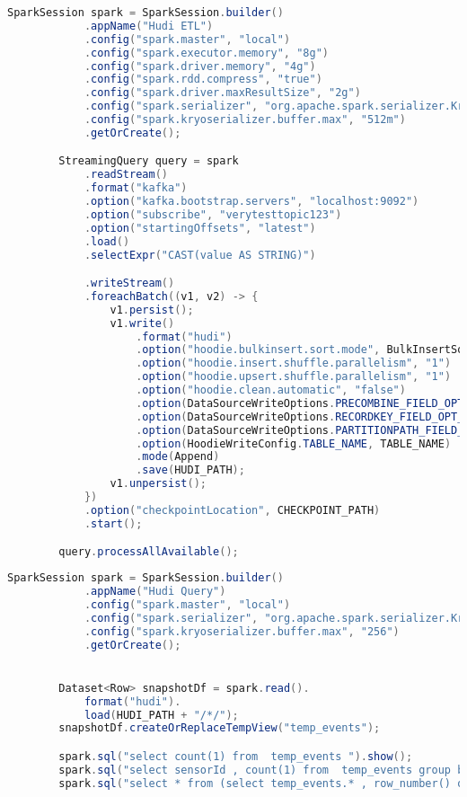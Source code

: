 \documentclass[%
bachelor,    %
subf,        %
href,        %
colorlinks,  %
]{disser}
\begin{document}
\begin{lstlisting}[caption={Запись из Kafka в Hudi таблицу},captionpos=b,label={lst:2},language=Java]
        SparkSession spark = SparkSession.builder()
            .appName("Hudi ETL")
            .config("spark.master", "local")
            .config("spark.executor.memory", "8g")
            .config("spark.driver.memory", "4g")
            .config("spark.rdd.compress", "true")
            .config("spark.driver.maxResultSize", "2g")
            .config("spark.serializer", "org.apache.spark.serializer.KryoSerializer")
            .config("spark.kryoserializer.buffer.max", "512m")
            .getOrCreate();

        StreamingQuery query = spark
            .readStream()
            .format("kafka")
            .option("kafka.bootstrap.servers", "localhost:9092")
            .option("subscribe", "verytesttopic123")
            .option("startingOffsets", "latest")
            .load()
            .selectExpr("CAST(value AS STRING)")

            .writeStream()
            .foreachBatch((v1, v2) -> {
                v1.persist();
                v1.write()
                    .format("hudi")
                    .option("hoodie.bulkinsert.sort.mode", BulkInsertSortMode.NONE.toString())
                    .option("hoodie.insert.shuffle.parallelism", "1")
                    .option("hoodie.upsert.shuffle.parallelism", "1")
                    .option("hoodie.clean.automatic", "false")
                    .option(DataSourceWriteOptions.PRECOMBINE_FIELD_OPT_KEY(), "timestamp")
                    .option(DataSourceWriteOptions.RECORDKEY_FIELD_OPT_KEY(), "uuid")
                    .option(DataSourceWriteOptions.PARTITIONPATH_FIELD_OPT_KEY(), "")
                    .option(HoodieWriteConfig.TABLE_NAME, TABLE_NAME)
                    .mode(Append)
                    .save(HUDI_PATH);
                v1.unpersist();
            })
            .option("checkpointLocation", CHECKPOINT_PATH)
            .start();

        query.processAllAvailable();
\end{lstlisting}
\newpage
\begin{lstlisting}[caption={Выполнение запросов к Hudi таблице},captionpos=b,label={lst:3},language=Java]	
        SparkSession spark = SparkSession.builder()
            .appName("Hudi Query")
            .config("spark.master", "local")
            .config("spark.serializer", "org.apache.spark.serializer.KryoSerializer")
            .config("spark.kryoserializer.buffer.max", "256")
            .getOrCreate();


        Dataset<Row> snapshotDf = spark.read().
            format("hudi").
            load(HUDI_PATH + "/*/");
        snapshotDf.createOrReplaceTempView("temp_events");

        spark.sql("select count(1) from  temp_events ").show();
        spark.sql("select sensorId , count(1) from  temp_events group by sensorId").show();
        spark.sql("select * from (select temp_events.* , row_number() over (partition by sensorId order by timestamp desc) as rnk from temp_events) where rnk=1").show();
\end{lstlisting}
\end{document}
